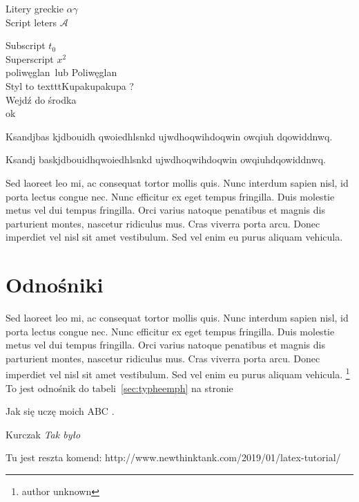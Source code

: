 \documentclass[a4paper,10pt]{book}
\newcommand{\pc}{poliwęglan}
\newcommand{\PC}{Poliwęglan}
\newcommand{\typew}[1]{texttt{#1}}
\begin{document}
Litery greckie $\alpha \gamma $ \\

Script leters $\mathcal{A} $

Subscript $t_0$ \\
Superscript $x^2$ \\

\pc\ lub \PC\ \\

Styl to \typew{Kupakupakupa} ? \\

{\centering
Wejdź do środka\\
ok\\[12pt]
}

\quad\parbox{4cm}{Ksandjbas kjdbouidh qwoiedhlsnkd ujwdhoqwihdoqwin owqiuh dqowiddnwq.}
\quad\parbox{2cm}{Ksandj baskjdb\-ouidh\-qwoiedhlsnkd ujwdhoqwihdoqwin owqiuhdqowiddnwq.}

\begin{minipage}{5cm}

Sed laoreet leo mi, ac consequat tortor mollis quis. Nunc interdum sapien nisl, id porta lectus congue nec. Nunc efficitur ex eget tempus fringilla. Duis molestie metus vel dui tempus fringilla. Orci varius natoque penatibus et magnis dis parturient montes, nascetur ridiculus mus. Cras viverra porta arcu. Donec imperdiet vel nisl sit amet vestibulum. Sed vel enim eu purus aliquam vehicula. \\

\end{minipage}

\section{Odnośniki}

Sed laoreet leo mi, ac consequat tortor mollis quis. Nunc interdum sapien nisl, id porta lectus congue nec. Nunc efficitur ex eget tempus fringilla. Duis molestie metus vel dui tempus fringilla. Orci varius natoque penatibus et magnis dis parturient montes, nascetur ridiculus mus. Cras viverra porta arcu. Donec imperdiet vel nisl sit amet vestibulum. Sed vel enim eu purus aliquam vehicula. 
\footnote{author unknown} \\[5pt]

To jest odnośnik do tabeli~\ref{sec:typheemph} na stronie~\pageref{sec:typheemph}

Jak się uczę moich ABC \cite{ABCDE}.


\begin{thebibliography}{books}
	 Kurczak \emph{Tak było}
\end{thebibliography}

Tu jest reszta komend: http://www.newthinktank.com/2019/01/latex-tutorial/
\end{document}

